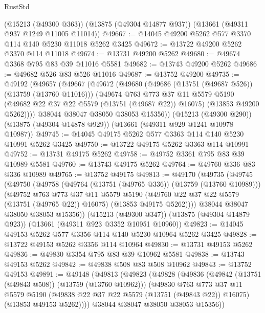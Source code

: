 \begin{lexlean}{RustStd}
\begin{coremodule}
    (@15213 (@49300 @363))
    (@13875 (@49304 @14877 @937))
    (@13661 (@49311 @937 @1249 @11005 @11014))
@49667 := @14045 @49200 @5262 @577 @3370 @114 @140 @5230 @11018 @5262 @3425
@49672 := @13722 @49200 @5262 @3370 @114 @11018
@49674 := @13731 @49200 @5262
@49680 := @49674 @3368 @795 @83 @39 @11016 @5581
@49682 := @13743 @49200 @5262
@49686 := @49682 @526 @83 @526 @11016
@49687 := @13752 @49200
@49735 := @49192
    (@49657
      (@49667
        (@49672
          (@49680
            (@49686 (@13751 (@49687 @526)) (@13759 (@13760 @11016)))
            (@49674
              @763
              @773
              @37
              @11
              @5579
              @5190
              (@49682 @22 @37 @22 @5579 (@13751 (@49687 @22)) @16075)
              (@13853 @49200 @5262))))
        @38044
        @38047
        @38050
        @38053
        @15356))
    (@15213 (@49300 @290))
    (@13875 (@49304 @14878 @929))
    (@13661 (@49311 @929 @1241 @10978 @10987))
@49745 := @14045 @49175 @5262 @577 @3363 @114 @140 @5230 @10991 @5262 @3425
@49750 := @13722 @49175 @5262 @3363 @114 @10991
@49752 := @13731 @49175 @5262
@49758 := @49752 @3361 @795 @83 @39 @10989 @5581
@49760 := @13743 @49175 @5262
@49764 := @49760 @336 @83 @336 @10989
@49765 := @13752 @49175
@49813 := @49170
    (@49735
      (@49745
        (@49750
          (@49758
            (@49764 (@13751 (@49765 @336)) (@13759 (@13760 @10989)))
            (@49752
              @763
              @773
              @37
              @11
              @5579
              @5190
              (@49760 @22 @37 @22 @5579 (@13751 (@49765 @22)) @16075)
              (@13853 @49175 @5262))))
        @38044
        @38047
        @38050
        @38053
        @15356))
    (@15213 (@49300 @347))
    (@13875 (@49304 @14879 @923))
    (@13661 (@49311 @923 @3352 @10951 @10960))
@49823 := @14045 @49153 @5262 @577 @3356 @114 @140 @5230 @10964 @5262 @3425
@49828 := @13722 @49153 @5262 @3356 @114 @10964
@49830 := @13731 @49153 @5262
@49836 := @49830 @3354 @795 @83 @39 @10962 @5581
@49838 := @13743 @49153 @5262
@49842 := @49838 @508 @83 @508 @10962
@49843 := @13752 @49153
@49891 := @49148
    (@49813
      (@49823
        (@49828
          (@49836
            (@49842 (@13751 (@49843 @508)) (@13759 (@13760 @10962)))
            (@49830
              @763
              @773
              @37
              @11
              @5579
              @5190
              (@49838 @22 @37 @22 @5579 (@13751 (@49843 @22)) @16075)
              (@13853 @49153 @5262))))
        @38044
        @38047
        @38050
        @38053
        @15356))

\end{coremodule}
\end{lexlean}
